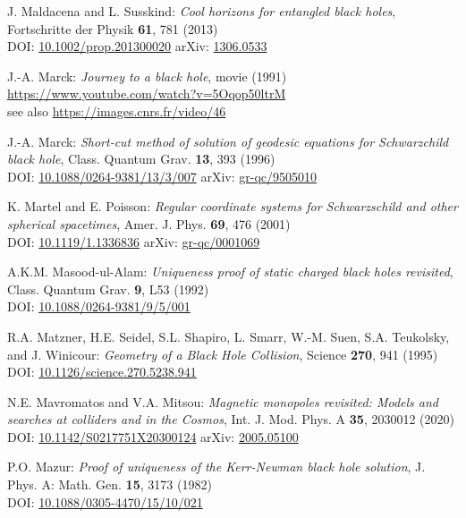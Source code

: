 \begin{thebibliography}{123}
J. Maldacena and L. Susskind:
{\em Cool horizons for entangled black holes},
Fortschritte der Physik {\bf 61}, 781 (2013)\\
DOI: \href{https://doi.org/10.1002/prop.201300020}{10.1002/prop.201300020}\hfill
arXiv: \href{https://arxiv.org/abs/1306.0533}{1306.0533}

J.-A. Marck:
{\em Journey to a black hole}, movie (1991)\\
\url{https://www.youtube.com/watch?v=5Oqop50ltrM}\\
see also \url{https://images.cnrs.fr/video/46}

J.-A. Marck:
{\em Short-cut method of solution of geodesic equations for Schwarzchild black hole},
Class. Quantum Grav. {\bf 13}, 393 (1996)\\
DOI: \href{https://doi.org/10.1088/0264-9381/13/3/007}{10.1088/0264-9381/13/3/007}\hfill
arXiv: \href{https://arxiv.org/abs/gr-qc/9505010}{gr-qc/9505010}

K. Martel and E. Poisson:
{\em Regular coordinate systems for Schwarzschild and other spherical spacetimes},
Amer. J. Phys. {\bf 69}, 476 (2001)\\
DOI: \href{https://doi.org/10.1119/1.1336836}{10.1119/1.1336836}\hfill
arXiv: \href{https://arxiv.org/abs/gr-qc/0001069}{gr-qc/0001069}

A.K.M. Masood-ul-Alam:
{\em Uniqueness proof of static charged black holes revisited},
Class. Quantum Grav. {\bf 9}, L53 (1992)\\
DOI: \href{https://doi.org/10.1088/0264-9381/9/5/001}{10.1088/0264-9381/9/5/001}

R.A. Matzner, H.E. Seidel, S.L. Shapiro, L. Smarr, W.-M. Suen, S.A. Teukolsky, and
J. Winicour: {\em Geometry of a Black Hole Collision},
Science {\bf 270}, 941 (1995)\\
DOI: \href{https://doi.org/10.1126/science.270.5238.941}{10.1126/science.270.5238.941}

N.E. Mavromatos and V.A. Mitsou:
{\em Magnetic monopoles revisited: Models and searches at colliders and in the Cosmos},
Int. J. Mod. Phys. A {\bf 35}, 2030012 (2020)\\
DOI: \href{https://doi.org/10.1142/S0217751X20300124}{10.1142/S0217751X20300124}\hfill
arXiv: \href{https://arxiv.org/abs/2005.05100}{2005.05100}

P.O. Mazur:
{\em Proof of uniqueness of the Kerr-Newman black hole solution},
J. Phys. A: Math. Gen. {\bf 15}, 3173 (1982)\\
DOI: \href{https://doi.org/10.1088/0305-4470/15/10/021}{10.1088/0305-4470/15/10/021}


\end{thebibliography}
